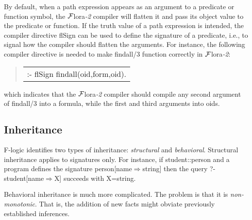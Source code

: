 \documentclass[11pt]{article}
\newenvironment{qrules}{\begin{quote}\sf\begin{tabular}[t]{l}}%
{\end{tabular}\end{quote}}
\newcommand{\Fd}{\ensuremath{{\Rightarrow}}}                      %
\newcommand{\FLORA}{{\mbox{${\cal F}${\sc lora}\rm\emph{-2}}}\xspace}
\newcommand{\fl}{\mbox{F-logic}\xspace}
\begin{document}
%
By default, when a path expression appears as an argument to a
predicate or function symbol, the \FLORA compiler will flatten it and
pass its object value to the predicate or function. If the truth value
of a path expression is intended, the compiler directive {\sf flSign}
can be used to define the signature of a predicate, i.e., to signal
how the compiler should flatten the arguments. For instance, the
following compiler directive is needed to make {\sf findall/3}
function correctly in \FLORA:
\begin{qrules}
:- flSign findall(oid,form,oid).
\end{qrules}
which indicates that the \FLORA compiler should compile
any second argument of {\sf findall/3} into a formula, while the
first and third arguments into oids.



\subsection{Inheritance}


\fl identifies two types of inheritance: \emph{structural} and
\emph{behavioral}.  Structural inheritance applies to signatures only. For
instance, if {\sf student::person} and a program defines the signature
{\sf person[name{\Fd}string]} then the query {\sf ?- student[name{\Fd}X]}
succeeds with {\sf X=string}.

Behavioral inheritance is much more complicated. The problem  is that it is
\emph{non-monotonic}. That is, the addition of new facts might obviate previously
established inferences.
\end{document}
